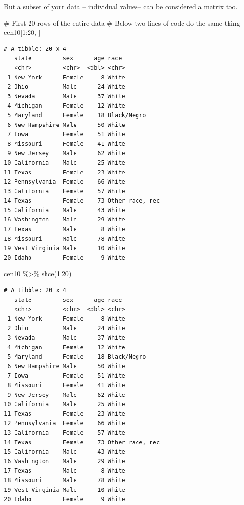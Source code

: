 \documentclass[
  letterpaper,
]{book}
\newenvironment{Shaded}{\begin{snugshade}}{\end{snugshade}}
\newcommand{\CommentTok}[1]{\textcolor[rgb]{0.37,0.37,0.37}{#1}}
\newcommand{\DecValTok}[1]{\textcolor[rgb]{0.68,0.00,0.00}{#1}}
\newcommand{\FunctionTok}[1]{\textcolor[rgb]{0.28,0.35,0.67}{#1}}
\newcommand{\NormalTok}[1]{\textcolor[rgb]{0.00,0.23,0.31}{#1}}
\newcommand{\SpecialCharTok}[1]{\textcolor[rgb]{0.37,0.37,0.37}{#1}}
\theoremstyle{definition}
\theoremstyle{definition}
\theoremstyle{plain}
\theoremstyle{definition}
\theoremstyle{plain}
\theoremstyle{plain}
\theoremstyle{remark}
\begin{document}
But a subset of your data -- individual values-- can be considered a
matrix too.

\begin{Shaded}
\begin{Highlighting}[]
\CommentTok{\# First 20 rows of the entire data}
\CommentTok{\# Below two lines of code do the same thing}
\NormalTok{cen10[}\DecValTok{1}\SpecialCharTok{:}\DecValTok{20}\NormalTok{, ]}
\end{Highlighting}
\end{Shaded}

\begin{verbatim}
# A tibble: 20 x 4
   state         sex      age race           
   <chr>         <chr>  <dbl> <chr>          
 1 New York      Female     8 White          
 2 Ohio          Male      24 White          
 3 Nevada        Male      37 White          
 4 Michigan      Female    12 White          
 5 Maryland      Female    18 Black/Negro    
 6 New Hampshire Male      50 White          
 7 Iowa          Female    51 White          
 8 Missouri      Female    41 White          
 9 New Jersey    Male      62 White          
10 California    Male      25 White          
11 Texas         Female    23 White          
12 Pennsylvania  Female    66 White          
13 California    Female    57 White          
14 Texas         Female    73 Other race, nec
15 California    Male      43 White          
16 Washington    Male      29 White          
17 Texas         Male       8 White          
18 Missouri      Male      78 White          
19 West Virginia Male      10 White          
20 Idaho         Female     9 White          
\end{verbatim}

\begin{Shaded}
\begin{Highlighting}[]
\NormalTok{cen10 }\SpecialCharTok{\%\textgreater{}\%} \FunctionTok{slice}\NormalTok{(}\DecValTok{1}\SpecialCharTok{:}\DecValTok{20}\NormalTok{)}
\end{Highlighting}
\end{Shaded}

\begin{verbatim}
# A tibble: 20 x 4
   state         sex      age race           
   <chr>         <chr>  <dbl> <chr>          
 1 New York      Female     8 White          
 2 Ohio          Male      24 White          
 3 Nevada        Male      37 White          
 4 Michigan      Female    12 White          
 5 Maryland      Female    18 Black/Negro    
 6 New Hampshire Male      50 White          
 7 Iowa          Female    51 White          
 8 Missouri      Female    41 White          
 9 New Jersey    Male      62 White          
10 California    Male      25 White          
11 Texas         Female    23 White          
12 Pennsylvania  Female    66 White          
13 California    Female    57 White          
14 Texas         Female    73 Other race, nec
15 California    Male      43 White          
16 Washington    Male      29 White          
17 Texas         Male       8 White          
18 Missouri      Male      78 White          
19 West Virginia Male      10 White          
20 Idaho         Female     9 White          
\end{verbatim}
\end{document}
